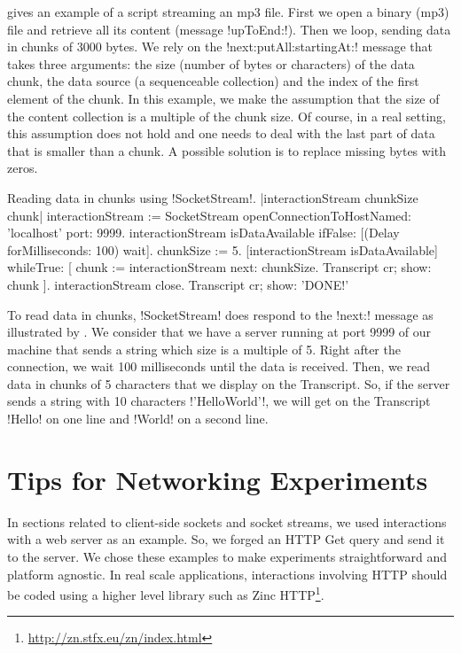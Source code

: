 \documentclass[a4paper,10pt,twoside]{book}
\begin{document}
 gives an example of a script streaming an mp3 file.
First we open a binary (mp3) file and retrieve all its content (message \ct!upToEnd:!).
Then we loop, sending data in chunks of 3000 bytes.
We rely on the \ct!next:putAll:startingAt:! message that takes three arguments: the size (number of bytes or characters) of the data chunk,
the data source (a sequenceable collection) and the index of the first element of the chunk.
In this example, we make the assumption that the size of the content collection is a multiple of the chunk size.
Of course, in a real setting, this assumption does not hold and one needs to deal with the last part of data that is smaller than a chunk.
A possible solution is to replace missing bytes with zeros.

\begin{script}{Reading data in chunks using \ct!SocketStream!.}
	|interactionStream chunkSize chunk|
	interactionStream := SocketStream 
											openConnectionToHostNamed: 'localhost' port: 9999.
	interactionStream isDataAvailable ifFalse: [(Delay forMilliseconds: 100) wait].
	chunkSize := 5.
	[interactionStream isDataAvailable] whileTrue: [
		chunk  :=  interactionStream next: chunkSize.
		Transcript cr; show: chunk
	].
	interactionStream close.
	Transcript cr; show: 'DONE!'
\end{script}


To read data in chunks, \ct!SocketStream! does respond to the \ct!next:! message as illustrated by .
We consider that we have a server running at port 9999 of our machine that sends a string which size is a multiple of 5.
Right after the connection, we wait 100 milliseconds until the data is received.
Then, we read data in chunks of 5 characters that we display on the Transcript.
So, if the server sends a string with 10 characters \ct!'HelloWorld'!, we will get on the Transcript \ct!Hello! on one line and \ct!World! on a second line.

\section{Tips for Networking Experiments}
In sections related to client-side sockets and socket streams, we used interactions with a web server as an example. So, we forged an HTTP Get query and send it to the server.
We chose these examples to make experiments straightforward and platform agnostic.
In real scale applications, interactions involving HTTP should be coded using a higher level library such as Zinc HTTP\footnote{\url{http://zn.stfx.eu/zn/index.html}}.
\end{document}
